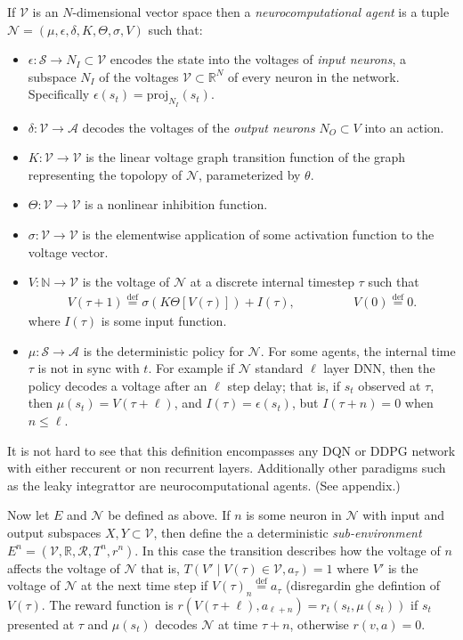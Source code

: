 \documentclass{article} %
\numberwithin{equation}{subsection}
\numberwithin{theorem}{subsection}
\def\suchthat{\mathrel{}\middle|\mathrel{}}
\def\defeq{\stackrel{\text{def}}{=}}
\def\scriptv{{\mathcal V}}
\def\scripta{{\mathcal A}}
\def\scriptr{{\mathcal R}}
\def\scriptn{{\mathcal N}}
\def\scripts{{\mathcal S}}
\begin{document}
If $\scriptv$ is an $N$-dimensional vector space then a \emph{neurocomputational agent} is a tuple $\scriptn = (\mu, \epsilon, \delta, K, \Theta, \sigma, V)$ such that: 
\begin{itemize}
	\item $\epsilon : \scripts  \to N_I \subset \scriptv$ encodes the state into the voltages of \emph{input neurons}, a subspace $N_I$ of the voltages $\scriptv\subset \mathbb{R}^N$ of every neuron in the network. Specifically $\epsilon(s_t) = \mathrm{proj}_{N_I}(s_t)$.
	\item $\delta: \scriptv \to \scripta$ decodes the voltages of the \emph{output neurons }$N_O \subset V$ into an action.
	\item $K: \scriptv \to \scriptv$ is the linear voltage graph transition function of the graph representing the topolopy of $\scriptn$, parameterized by $\theta$.
	\item $\Theta: \scriptv \to \scriptv$ is a nonlinear inhibition function.
	\item $\sigma: \scriptv \to \scriptv$ is the elementwise application of some activation function to the voltage vector.
	\item $V: \mathbb{N} \to \scriptv$ is the voltage of $\scriptn$ at a discrete internal timestep $\tau$ such that
	\begin{equation}
		\begin{aligned}
			V(\tau+1) \defeq \sigma\left(K\Theta[V(\tau)]\right) + I(\tau),&\;\;\;\;\;\;\;\;\;\;\;&	V(0) \defeq 0.
		\end{aligned}
	\end{equation}
	where $I(\tau)$ is some input function.
	\item $\mu: \scripts \to \scripta$ is the deterministic policy for $\scriptn$. 
For some agents, the internal time $\tau$ is not in sync with $t$. For example if $\scriptn$ standard $\ell$ layer DNN, then the policy decodes a voltage after an $\ell$ step delay; that is, if $s_t$ observed at $\tau$, then $\mu(s_t) = V(\tau +\ell)$, and $I(\tau) = \epsilon(s_t)$, but $I(\tau +n) =0$ when $n \leq \ell$.
\end{itemize}
It is not hard to see that this definition encompasses any DQN or DDPG network with either reccurent or non recurrent layers. Additionally other paradigms such as the leaky integrattor are neurocomputational agents. (See appendix.)

Now let $E$ and $\scriptn$ be defined as above. If $n$ is some neuron in $\scriptn$ with input and output subspaces $X,Y \subset \mathcal{V}$, then define the a deterministic \emph{sub-environment} $E^n = (\scriptv, \mathbb{R}, \scriptr, T^n, r^n)$. In this case the transition describes how the voltage of $n$ affects the voltage of $\scriptn$ that is, $T\left(V' \suchthat V(\tau) \in \scriptv, a_\tau\right) = 1$ where $V'$ is the voltage of $\scriptn$ at the next time step if $V(\tau)_n \defeq a_\tau$ (disregardin ghe defintion of $V(\tau)$. The reward function is $r(V(\tau +\ell), a_{\ell + n}) = r_t(s_t, \mu(s_t))$ if $s_t$ presented at $\tau$ and $\mu(s_t)$ decodes $\scriptn$ at time $\tau + n$, otherwise $r(v,a) = 0.$
\end{document}
